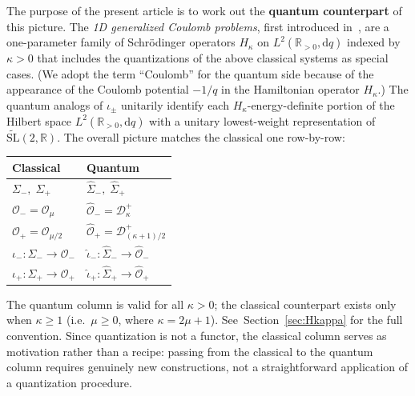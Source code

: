 \documentclass[11pt]{article}
\theoremstyle{plain}
\theoremstyle{definition}
\theoremstyle{remark}
\newcommand{\R}{\mathbb{R}}
\newcommand{\SLt}{\widetilde{\mathrm{SL}}}
\newcommand{\Sigmah}{\widehat{\Sigma}}
\newcommand{\OO}{\mathcal{O}}
\newcommand{\OOh}{\widehat{\mathcal{O}}}
\newcommand{\D}{\mathcal{D}}
\begin{document}
The purpose of the present article is to work out the \textbf{quantum
counterpart} of this picture. The \emph{1D generalized Coulomb problems},
first introduced in~\cite{Meng2014}, are a one-parameter family of
Schr\"odinger operators $H_{\kappa}$ on $L^{2}(\R_{>0},\mathrm{d}q)$ indexed
by $\kappa>0$ that includes the quantizations of the above classical systems
as special cases. (We adopt
the term ``Coulomb'' for the quantum side because of the appearance of the Coulomb potential $-1/q$
in the Hamiltonian operator $H_{\kappa}$.)
The quantum analogs of $\iota_{\pm}$ unitarily identify each
$H_{\kappa}$-energy-definite portion of the Hilbert space
$L^{2}(\R_{>0},\mathrm{d}q)$ with a unitary lowest-weight representation
of $\SLt(2,\R)$. The
overall picture matches the classical one row-by-row:
\begin{center}
\renewcommand{\arraystretch}{1.25}
\begin{tabular}{@{}ll@{}}
\toprule
Classical & Quantum \\
\midrule
$\Sigma_{-},\;\Sigma_{+}$
  & $\Sigmah_{-},\;\Sigmah_{+}$\\
$\OO_{-}=\OO_{\mu}$
  & $\OOh_{-}=\D^{+}_{\kappa}$\\
$\OO_{+}=\OO_{\mu/2}$
  & $\OOh_{+}=\D^{+}_{(\kappa+1)/2}$\\
$\iota_{-}\colon\Sigma_{-}\!\to\!\OO_{-}$
  & $\hat\iota_{-}\colon\Sigmah_{-}\!\to\!\OOh_{-}$ \\
$\iota_{+}\colon\Sigma_{+}\!\to\!\OO_{+}$
  & $\hat\iota_{+}\colon\Sigmah_{+}\!\to\!\OOh_{+}$\\
\bottomrule
\end{tabular}
\end{center}
\noindent The quantum column is valid for all $\kappa>0$; the classical
counterpart exists only when $\kappa\ge 1$ (i.e.\ $\mu\ge 0$, where
$\kappa=2\mu+1$). See~Section~\ref{sec:Hkappa} for the full convention. Since quantization is not a functor, the classical column serves as motivation rather than a recipe: passing from the classical to the quantum column requires genuinely new constructions, not a straightforward application of a quantization procedure.
\end{document}
